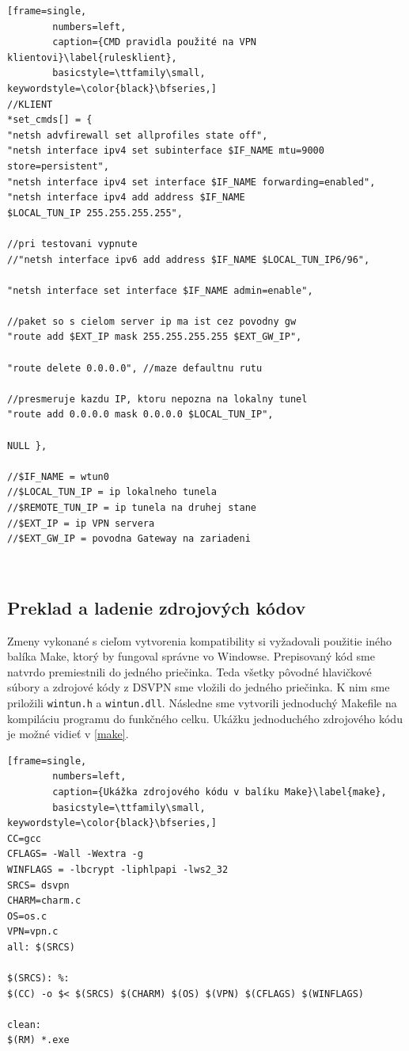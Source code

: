 \begin{minipage}{\linewidth} 	
	\begin{lstlisting}[frame=single,
		numbers=left,
		caption={CMD pravidla použité na VPN klientovi}\label{rulesklient},
		basicstyle=\ttfamily\small, keywordstyle=\color{black}\bfseries,]
//KLIENT
*set_cmds[] = {
"netsh advfirewall set allprofiles state off",
"netsh interface ipv4 set subinterface $IF_NAME mtu=9000 
store=persistent",
"netsh interface ipv4 set interface $IF_NAME forwarding=enabled",
"netsh interface ipv4 add address $IF_NAME 
$LOCAL_TUN_IP 255.255.255.255",

//pri testovani vypnute			
//"netsh interface ipv6 add address $IF_NAME $LOCAL_TUN_IP6/96",

"netsh interface set interface $IF_NAME admin=enable",
			
//paket so s cielom server ip ma ist cez povodny gw 
"route add $EXT_IP mask 255.255.255.255 $EXT_GW_IP",
	
"route delete 0.0.0.0", //maze defaultnu rutu 
			
//presmeruje kazdu IP, ktoru nepozna na lokalny tunel                             
"route add 0.0.0.0 mask 0.0.0.0 $LOCAL_TUN_IP", 
			
NULL },    
		
//$IF_NAME = wtun0
//$LOCAL_TUN_IP = ip lokalneho tunela
//$REMOTE_TUN_IP = ip tunela na druhej stane
//$EXT_IP = ip VPN servera
//$EXT_GW_IP = povodna Gateway na zariadeni
	\end{lstlisting}
\end{minipage}\\ 

\subsection{Preklad a ladenie zdrojových kódov}
Zmeny vykonané s cieľom vytvorenia kompatibility si vyžadovali použitie iného balíka Make, ktorý by fungoval správne vo Windowse. Prepisovaný kód sme natvrdo premiestnili do jedného priečinka. Teda všetky pôvodné hlavičkové súbory a zdrojové kódy z DSVPN sme vložili do jedného priečinka. K nim sme priložili \lstinline|wintun.h| a \lstinline|wintun.dll|. Následne sme vytvorili jednoduchý Makefile na kompiláciu programu do funkčného celku. Ukážku jednoduchého zdrojového kódu je možné vidieť v \ref{make}. 

\begin{minipage}{\linewidth} 	
	\begin{lstlisting}[frame=single,
		numbers=left,
		caption={Ukážka zdrojového kódu v balíku Make}\label{make},
		basicstyle=\ttfamily\small, keywordstyle=\color{black}\bfseries,]
CC=gcc
CFLAGS= -Wall -Wextra -g 
WINFLAGS = -lbcrypt -liphlpapi -lws2_32
SRCS= dsvpn
CHARM=charm.c
OS=os.c
VPN=vpn.c
all: $(SRCS) 

$(SRCS): %:
$(CC) -o $< $(SRCS) $(CHARM) $(OS) $(VPN) $(CFLAGS) $(WINFLAGS)

clean:
$(RM) *.exe 
	\end{lstlisting}
\end{minipage}\\

